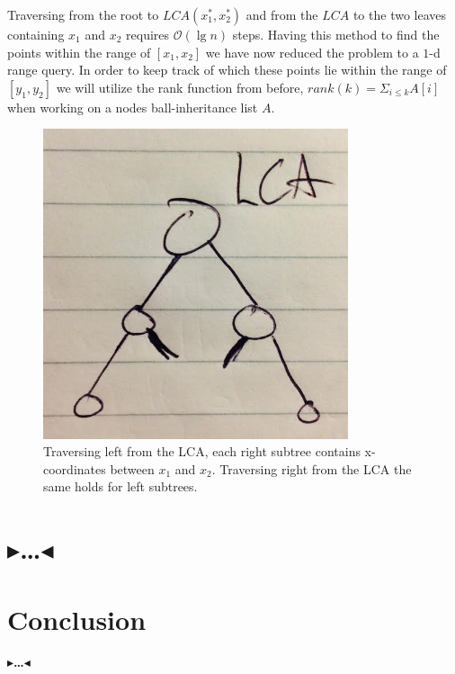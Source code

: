 \documentclass[twoside,11pt,openright]{report}
\newcommand{\todo}[1]{{\color[rgb]{.5,0,0}\textbf{$\blacktriangleright$#1$\blacktriangleleft$}}}
\begin{document}
Traversing from the root to $LCA(x^*_1, x^*_2)$ and from the $LCA$ to the two leaves containing $x_1$ and $x_2$ requires $\mathcal{O}(\lg n)$ steps. Having this method to find the points within the range of $[x_1, x_2]$ we have now reduced the problem to a $1$-d range query. In order to keep track of which these points lie within the range of $[y_1, y_2]$ we will utilize the rank function from before, $rank(k) = \Sigma_{i \leq k} A[i]$ when working on a nodes ball-inheritance list $A$.


\begin{figure}[p]
    \centering
    \includegraphics[width=0.8\textwidth]{pictures/LCA.png}
    \caption{Traversing left from the LCA, each right subtree contains x-coordinates between $x_1$ and $x_2$. Traversing right from the LCA the same holds for left subtrees.}
    \label{fig:LCA}
\end{figure}

\chapter{\todo{\dots}}
\label{ch:main}



\chapter{Conclusion}
\label{ch:conclusion}

\todo{\dots}


 

\end{document}
